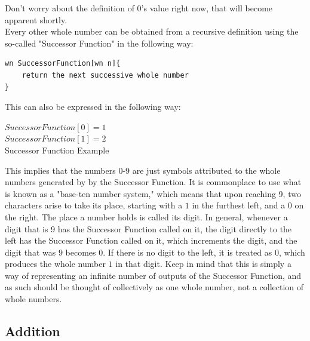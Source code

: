 Don't worry about the definition of $0$'s value right now, that will become apparent shortly. \\
Every other whole number can be obtained from a recursive definition using the so-called "Successor Function" in the following way:
\begin{center}
\begin{verbatim}
wn SuccessorFunction[wn n]{
	return the next successive whole number
}
\end{verbatim}
\end{center} 
This can also be expressed in the following way:
\begin{center}
$SuccessorFunction[0] = 1$\\
$SuccessorFunction[1] = 2$\\
Successor Function Example\label{eq:sucFuncEx}
\end{center}
This implies that the numbers $0$-$9$ are just symbols attributed to the whole numbers generated by by the Successor Function. It is commonplace to use what is known as a "base-ten number system," which means that upon reaching 9, two characters arise to take its place, starting with a $1$ in the furthest left, and a $0$ on the right. The place a number holds is called its digit. In general, whenever a digit that is 9 has the Successor Function called on it, the digit directly to the left has the Successor Function called on it, which increments the digit, and the digit that was $9$ becomes $0$. If there is no digit to the left, it is treated as $0$, which produces the whole number $1$ in that digit. Keep in mind that this is simply a way of representing an infinite number of outputs of the Successor Function, and as such should be thought of collectively as one whole number, not a collection of whole numbers. \\


\subsection{Addition}

